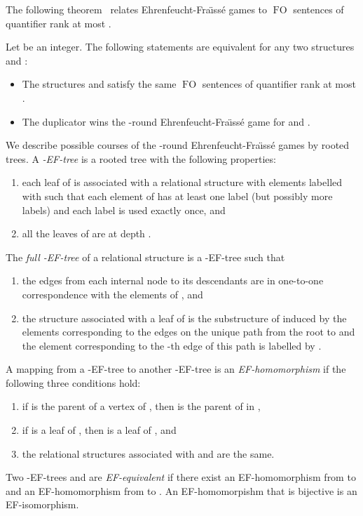 \documentclass{CSML}
\newcommand{\FO}{\ensuremath{\operatorname{FO}}\xspace}
\theoremstyle{plain}\newtheorem{claim}[thm]{Claim}
\begin{document}
The following theorem~\cite{ehr61,fra54} relates Ehrenfeucht-Fra{\"\i}ss\'e games to \FO sentences of quantifier rank at most .

\begin{thm}
\label{thm-EF}
Let  be an integer. The following statements are equivalent for any two structures  and :
\begin{itemize}
\item The structures  and  satisfy the same \FO sentences of quantifier rank at most .
\item The duplicator wins the -round Ehrenfeucht-Fra{\"\i}ss\'e game for  and .
\end{itemize}
\end{thm}

We describe possible courses of the -round Ehrenfeucht-Fra{\"\i}ss\'e games by rooted trees.
A {\em -EF-tree } is a rooted tree with the following properties:
\begin{enumerate}
\item each leaf  of  is associated with a relational structure  with elements labelled with  such that each element of  has at least one label (but possibly more labels) and each label is used exactly once, and
\item all the leaves of  are at depth .
\end{enumerate}
The {\em full -EF-tree } of a relational structure  is a -EF-tree  such that
\begin{enumerate}
\item the edges from each internal node  to its descendants are in one-to-one correspondence with the elements of , and
\item the structure  associated with a leaf  of  is the substructure of  induced by the elements corresponding to the edges on the unique path from the root to  and the element corresponding to the -th edge of this path is labelled by .
\end{enumerate}
A mapping  from a -EF-tree  to another -EF-tree  is an {\em EF-homomor\-phi\-sm} if the following three conditions hold:
\begin{enumerate}
\item if  is the parent of a vertex  of , then  is the parent of  in ,
\item if  is a leaf of , then  is a leaf of , and
\item the relational structures associated with  and  are the same.
\end{enumerate}
Two -EF-trees  and  are {\em EF-equivalent}
if there exist an EF-homomorphism from  to  and an EF-homomorphism from  to .
An EF-homomorpishm that is bijective is an EF-isomorphism.
\end{document}
